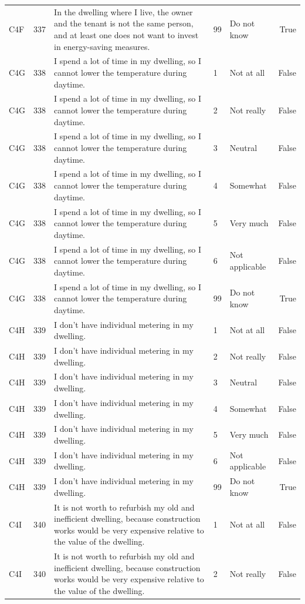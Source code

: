 \begin{tabular}{lrlllr}
C4F & 337 & In the dwelling where I live, the owner and the tenant is not the same person, and at least one does not want to invest in energy-saving measures. & 99 & Do not know & True \\
C4G & 338 &  I spend a lot of time in my dwelling, so I cannot lower the temperature during daytime. & 1 & Not at all & False \\
C4G & 338 &  I spend a lot of time in my dwelling, so I cannot lower the temperature during daytime. & 2 & Not really & False \\
C4G & 338 &  I spend a lot of time in my dwelling, so I cannot lower the temperature during daytime. & 3 & Neutral & False \\
C4G & 338 &  I spend a lot of time in my dwelling, so I cannot lower the temperature during daytime. & 4 & Somewhat & False \\
C4G & 338 &  I spend a lot of time in my dwelling, so I cannot lower the temperature during daytime. & 5 & Very much & False \\
C4G & 338 &  I spend a lot of time in my dwelling, so I cannot lower the temperature during daytime. & 6 & Not applicable & False \\
C4G & 338 &  I spend a lot of time in my dwelling, so I cannot lower the temperature during daytime. & 99 & Do not know & True \\
C4H & 339 & I don’t have individual metering in my dwelling. & 1 & Not at all & False \\
C4H & 339 & I don’t have individual metering in my dwelling. & 2 & Not really & False \\
C4H & 339 & I don’t have individual metering in my dwelling. & 3 & Neutral & False \\
C4H & 339 & I don’t have individual metering in my dwelling. & 4 & Somewhat & False \\
C4H & 339 & I don’t have individual metering in my dwelling. & 5 & Very much & False \\
C4H & 339 & I don’t have individual metering in my dwelling. & 6 & Not applicable & False \\
C4H & 339 & I don’t have individual metering in my dwelling. & 99 & Do not know & True \\
C4I & 340 & It is not worth to refurbish my old and inefficient dwelling, because construction works would be very expensive relative to the value of the dwelling. & 1 & Not at all & False \\
C4I & 340 & It is not worth to refurbish my old and inefficient dwelling, because construction works would be very expensive relative to the value of the dwelling. & 2 & Not really & False \\

\end{tabular}
